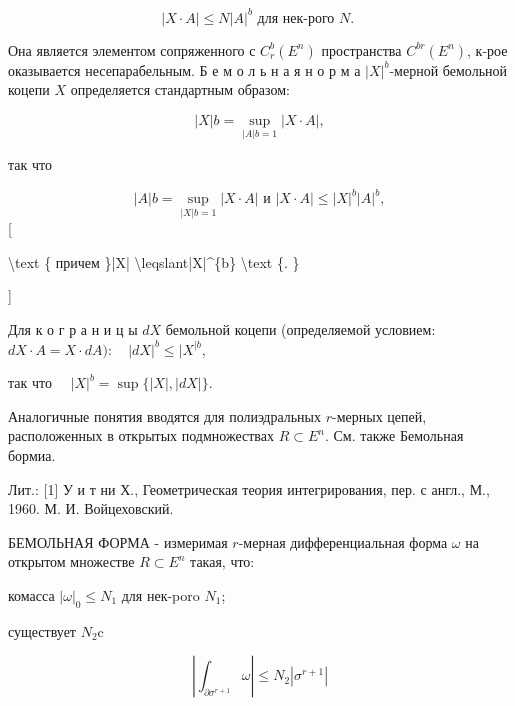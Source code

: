 \documentclass[10pt]{article}
\begin{document}
\[

|X \cdot A| \leqslant N|A|^{b} \text { для нек-рого } N \text {. }

\]



Она является элементом сопряженного с $C_{r}^{b}\left(E^{n}\right)$ пространства $C^{b r}\left(E^{n}\right)$, к-рое оказывается несепарабельным. Б е м о л ь н а я н о р м а $|X|^{b}$-мерной бемольной коцепи $X$ определяется стандартным образом:



\[

|X| b=\sup _{|A| b=1}|X \cdot A|,

\]



так что



\[

|A| b=\sup _{|X| b=1}|X \cdot A| \text { и }|X \cdot A| \leqslant|X|^{b}|A|^{b},

\][



\textbackslash text \{ причем \}|X| \textbackslash leqslant|X|\^{}\{b\} \textbackslash text \{. \}

]



Для к о г р а н и ц ы $d X$ бемольной коцепи (определяемой условием: $d X \cdot A=X \cdot d A): \quad|d X|^{b} \leqslant \mid X^{\mid b}$,



так что $\quad|X|^{b}=\sup \{|X|,|d X|\}$.



Аналогичные понятия вводятся для полиэдральных $r$-мерных цепей, расположенных в открытых подмножествах $R \subset E^{n}$. См. также Бемольная бормиа.



Лит.: [1] У и т ни Х., Геометрическая теория интегрирования, пер. с англ., М., 1960. М. И. Войцеховский.



БЕМОЛЬНАЯ ФОРМА - измеримая $r$-мерная дифференциальная форма $\omega$ на открытом множестве $R \subset E^{n}$ такая, что:



комасса $|\omega|_{0} \leqslant N_{1}$ для нек-poro $N_{1}$;



существует $N_{2} \mathrm{c}$



\[

\left|\int_{\partial \sigma^{r+1}} \omega\right| \leqslant N_{2}\left|\sigma^{r+1}\right|

\]
\end{document}
